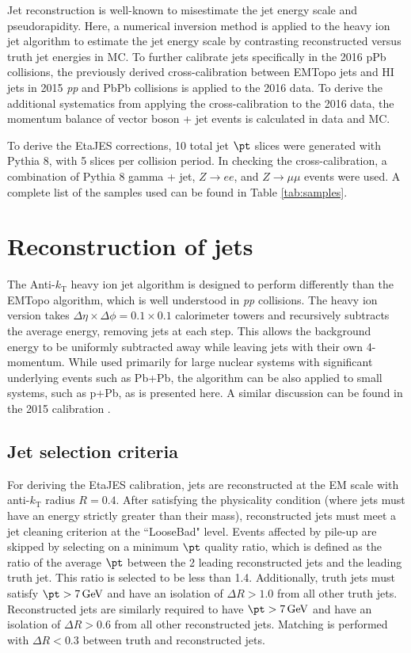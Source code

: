 \documentclass[NOTE, atlasdraft=true, texlive=2016, USenglish]{\ATLASLATEXPATH atlasdoc}
\begin{document}
Jet reconstruction is well-known to misestimate the jet energy scale and pseudorapidity. Here, a numerical inversion method is applied to the heavy ion jet algorithm to estimate the jet energy scale by contrasting reconstructed versus truth jet energies in MC. To further calibrate jets specifically in the 2016 pPb collisions, the previously derived cross-calibration between EMTopo jets and HI jets in 2015 \textit{pp} and PbPb collisions is applied to the 2016 data. To derive the additional systematics from applying the cross-calibration to the 2016 data, the momentum balance of vector boson + jet events is calculated in data and MC.\par
To derive the EtaJES corrections, 10 total jet $\pt$ slices were generated with Pythia 8, with 5 slices per collision period. In checking the cross-calibration, a combination of Pythia 8 gamma + jet, $Z\rightarrow ee$, and $Z\rightarrow \mu\mu$ events were used. A complete list of the samples used can be found in Table \ref{tab:samples}.


\section{Reconstruction of jets}
\label{sec:reconstruction}

The Anti-$k_{\text{T}}$ heavy ion jet algorithm is designed to perform differently than the EMTopo algorithm, which is well understood in \textit{pp} collisions. The heavy ion version takes $\Delta\eta\times\Delta\phi=0.1\times0.1$ calorimeter towers and recursively subtracts the average energy, removing jets at each step. This allows the background energy to be uniformly subtracted away while leaving jets with their own 4-momentum. While used primarily for large nuclear systems with significant underlying events such as Pb+Pb, the algorithm can be also applied to small systems, such as p+Pb, as is presented here. A similar discussion can be found in the 2015 calibration .\par
\subsection{Jet selection criteria}
For deriving the EtaJES calibration, jets are reconstructed at the EM scale with anti-$k_{\text{T}}$ radius $R=0.4$. After satisfying the physicality condition (where jets must have an energy strictly greater than their mass), reconstructed jets must meet a jet cleaning criterion at the ``LooseBad" level. Events affected by pile-up are skipped by selecting on a minimum $\pt$ quality ratio, which is defined as the ratio of the average $\pt$ between the 2 leading reconstructed jets and the leading truth jet. This ratio is selected to be less than 1.4. Additionally, truth jets must satisfy $\pt > \SI{7}{\GeV}$ and have an isolation of $\Delta R > 1.0$ from all other truth jets. Reconstructed jets are similarly required to have $\pt > \SI{7}{\GeV}$ and have an isolation of $\Delta R > 0.6$ from all other reconstructed jets. Matching is performed with $\Delta R < 0.3$ between truth and reconstructed jets.
\end{document}
